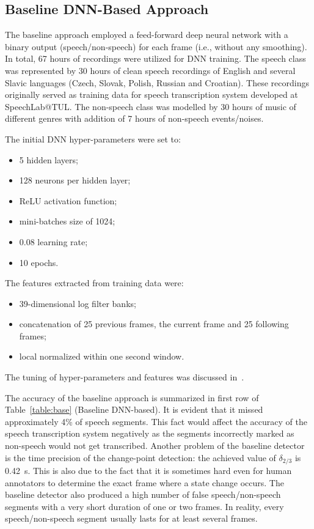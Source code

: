 \documentclass[FM,noheader,EN,bwtitles]{tulthesis}
\begin{document}
\subsection{Baseline DNN-Based Approach}
\label{ss:SADbaseline}
The baseline approach employed a feed-forward deep neural network with a binary output (speech/non-speech) for each frame (i.e., without any smoothing).
In total, 67 hours of recordings were utilized for DNN training.
The speech class was represented by 30 hours of clean speech recordings of English and several Slavic languages (Czech, Slovak, Polish, Russian and Croatian).
These recordings originally served as training data for speech transcription system developed at SpeechLab@TUL.
The non-speech class was modelled by 30 hours of music of different genres with addition of 7 hours of non-speech events/noises.

The initial DNN hyper-parameters were set to:
\begin{itemize}
\item 5 hidden layers;
\item 128 neurons per hidden layer;
\item ReLU activation function;
\item mini-batches size of 1024;
\item 0.08 learning rate;
\item 10 epochs.
\end{itemize}
The features extracted from training data were:
\begin{itemize}
\item 39-dimensional log filter banks; 
\item concatenation of 25 previous frames, the current frame and 25 following frames;
\item local normalized within one second window.
\end{itemize}
The tuning of hyper-parameters and features was discussed in~\parencite{SPRINGER17}.

The accuracy of the baseline approach is summarized in first row of Table~\ref{table:base} (Baseline DNN-based).
It is evident that it missed approximately 4\% of speech segments.
This fact would affect the accuracy of the speech transcription system negatively as the segments incorrectly marked as non-speech would not get transcribed.
Another problem of the baseline detector is the time precision of the change-point detection: the achieved value of $\delta_{2/3}$ is 0.42~s.
This is also due to the fact that it is sometimes hard even for human annotators to determine the exact frame where a state change occurs.
The baseline detector also produced a high number of false speech/non-speech segments with a very short duration of one or two frames.
In reality, every speech/non-speech segment usually lasts for at least several frames.
\end{document}
